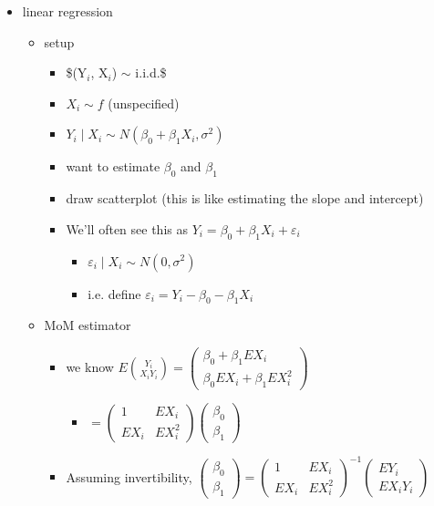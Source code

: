 \begin{itemize}
\begin{itemize}
\begin{itemize}
\end{itemize}
\end{itemize}
\item linear regression
\begin{itemize}
\item setup
\begin{itemize}
\item \$(Y$_i$, X$_i$) $\sim$ i.i.d.\$
\item $X_i \sim f$ (unspecified)
\item $Y_i \mid X_i \sim N(\beta_0 + \beta_1 X_i, \sigma^2)$
\item want to estimate $\beta_0$ and $\beta_1$
\item draw scatterplot (this is like estimating the slope and intercept)
\item We'll often see this as $Y_i = \beta_0 + \beta_1 X_i + \varepsilon_i$
\begin{itemize}
\item $\varepsilon_i \mid X_i \sim N(0, \sigma^2)$
\item i.e. define $\varepsilon_i = Y_i - \beta_0 - \beta_1 X_i$
\end{itemize}
\end{itemize}
\item MoM estimator
\begin{itemize}
\item we know $E \binom{Y_i}{X_i Y_i} = \begin{pmatrix} \beta_0 + \beta_1 E X_i \\ \beta_0 E X_i + \beta_1 E X_i^2 \end{pmatrix}$
\begin{itemize}
\item $= \begin{pmatrix} 1 & E X_i \\ E X_i & E X_i^2 \end{pmatrix} \begin{pmatrix}\beta_0 \\ \beta_1\end{pmatrix}$
\end{itemize}
\item Assuming invertibility, $\begin{pmatrix}\beta_0\\\beta_1\end{pmatrix} = \begin{pmatrix}1&EX_i\\EX_i&EX_i^2\end{pmatrix}^{-1} \begin{pmatrix}EY_i\\EX_iY_i\end{pmatrix}$

\end{itemize}
\end{itemize}
\end{itemize}
